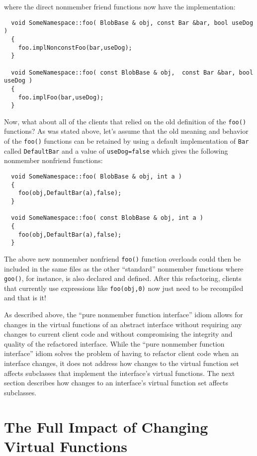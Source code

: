 \documentclass[pdf,ps2pdf,11pt]{SANDreport}
\begin{document}
{}\noindent{}where the direct nonmember friend functions now have the
implementation:

{\small\begin{verbatim}
  void SomeNamespace::foo( BlobBase & obj, const Bar &bar, bool useDog )
  {
    foo.implNonconstFoo(bar,useDog);
  }

  void SomeNamespace::foo( const BlobBase & obj,  const Bar &bar, bool useDog )
  {
    foo.implFoo(bar,useDog);
  }
\end{verbatim}}

Now, what about all of the clients that relied on the old definition of the
{}\texttt{foo()} functions?  As was stated above, let's assume that the old
meaning and behavior of the {}\texttt{foo()} functions can be retained by
using a default implementation of {}\texttt{Bar} called {}\texttt{DefaultBar}
and a value of {}\texttt{useDog=false} which gives the following nonmember
nonfriend functions:

{\small\begin{verbatim}
  void SomeNamespace::foo( BlobBase & obj, int a )
  {
    foo(obj,DefaultBar(a),false);
  }

  void SomeNamespace::foo( const BlobBase & obj, int a )
  {
    foo(obj,DefaultBar(a),false);
  }
\end{verbatim}}

The above new nonmember nonfriend {}\texttt{foo()} function overloads could
then be included in the same files as the other ``standard'' nonmember
functions where {}\texttt{goo()}, for instance, is also declared and defined.
After this refactoring, clients that currently use expressions like
{}\texttt{foo(obj,0)} now just need to be recompiled and that is it!

As described above, the ``pure nonmember function interface'' idiom allows for
changes in the virtual functions of an abstract interface without requiring
any changes to current client code and without compromising the integrity and
quality of the refactored interface.  While the ``pure nonmember function
interface'' idiom solves the problem of having to refactor client code when an
interface changes, it does not address how changes to the virtual function set
affects subclasses that implement the interface's virtual functions.  The next
section describes how changes to an interface's virtual function set affects
subclasses.

%
\section{The Full Impact of Changing Virtual Functions}
%
\end{document}
